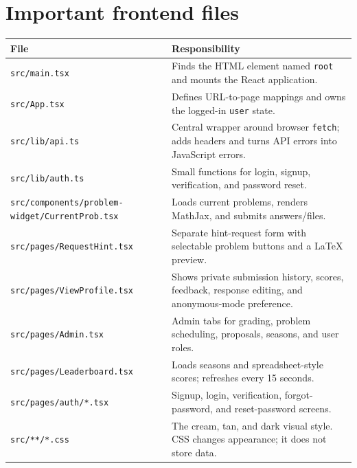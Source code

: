 \documentclass[11pt,oneside]{book}
\newcommand{\file}[1]{\texttt{#1}}
\newcommand{\code}[1]{\texttt{#1}}
\begin{document}
\section{Important frontend files}
\begin{longtable}{p{} p{}}
\toprule
File & Responsibility \\
\midrule
\endhead
\file{src/main.tsx} & Finds the HTML element named \code{root} and mounts the React application. \\
\file{src/App.tsx} & Defines URL-to-page mappings and owns the logged-in \code{user} state. \\
\file{src/lib/api.ts} & Central wrapper around browser \code{fetch}; adds headers and turns API errors into JavaScript errors. \\
\file{src/lib/auth.ts} & Small functions for login, signup, verification, and password reset. \\
\file{src/components/problem-widget/CurrentProb.tsx} & Loads current problems, renders MathJax, and submits answers/files. \\
\file{src/pages/RequestHint.tsx} & Separate hint-request form with selectable problem buttons and a LaTeX preview. \\
\file{src/pages/ViewProfile.tsx} & Shows private submission history, scores, feedback, response editing, and anonymous-mode preference. \\
\file{src/pages/Admin.tsx} & Admin tabs for grading, problem scheduling, proposals, seasons, and user roles. \\
\file{src/pages/Leaderboard.tsx} & Loads seasons and spreadsheet-style scores; refreshes every 15 seconds. \\
\file{src/pages/auth/*.tsx} & Signup, login, verification, forgot-password, and reset-password screens. \\
\file{src/**/*.css} & The cream, tan, and dark visual style. CSS changes appearance; it does not store data. \\
\bottomrule
\end{longtable}
\end{document}

